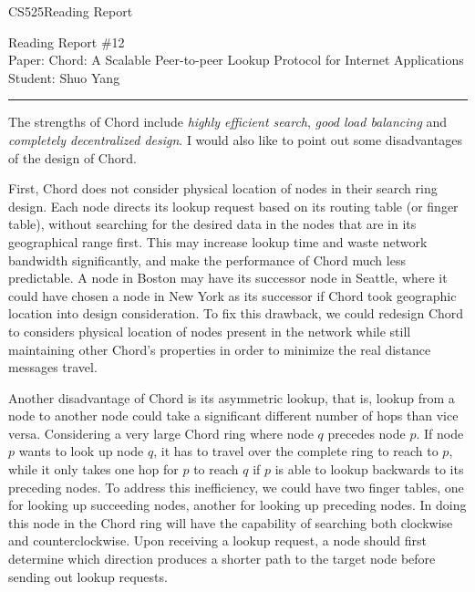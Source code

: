 \documentclass[11pt]{article}
\def\CourseCode{CS525}
\def\ReportNo{12}
\def\Category{Reading Report}
\def\PaperTitle{Chord: A Scalable Peer-to-peer Lookup Protocol for
  Internet Applications}
\def\Author{Shuo Yang}
\begin{document}
\noindent

\CourseCode \hfill \Category

\begin{center}
Reading Report \#\ReportNo\\
Paper: \PaperTitle\\
Student: \Author\\
\end{center}

\hrule\smallskip
\vspace{1.5em}

The strengths of Chord include \emph{highly efficient search},
\emph{good load balancing} and \emph{completely decentralized design}.
I would also like to point out some disadvantages of the design of Chord.

\vspace{1em}
First, Chord does not consider physical location of nodes in their
search ring design. Each node directs its lookup request based on
its routing table (or finger table), without searching for the desired
data in the nodes that are in its geographical range first. This may
increase lookup time and waste network bandwidth significantly, and
make the performance of Chord much less predictable. A node in
Boston may have its successor node in Seattle, where it could have
chosen a node in New York as its successor if Chord took geographic
location into design consideration. To fix this drawback, we could
redesign Chord to considers physical location of nodes present in the
network while still maintaining other Chord's properties in order to
minimize the real distance messages travel. 

\vspace{1em}
Another disadvantage of Chord is its asymmetric lookup, that is,
lookup from a node to another node could take a significant different number of
hops than vice versa. Considering a very large Chord ring where node
$q$ precedes node $p$. If node $p$ wants to look up node $q$, it has
to travel over the complete ring to reach to $p$, while it only takes
one hop for $p$ to reach $q$ if $p$ is able to lookup backwards to its
preceding nodes. To address this inefficiency, we could have two finger
tables, one for looking up succeeding nodes, another for looking up
preceding nodes. In doing this node in the Chord ring will have the
capability of searching both clockwise and counterclockwise. Upon
receiving a lookup request, a node should first determine which
direction produces a shorter path to the target node before sending
out lookup requests.
\end{document}

